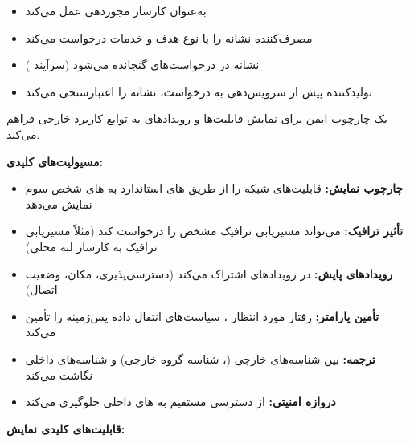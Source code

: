 \begin{itemize}
\tightlist
\item
   به‌عنوان کارساز مجوزدهی  عمل می‌کند
\item
   مصرف‌کننده نشانه را با نوع  هدف و خدمات درخواست می‌کند
\item
  نشانه در درخواست‌های  گنجانده می‌شود (سرآیند )
\item
   تولیدکننده پیش از سرویس‌دهی به درخواست، نشانه را اعتبارسنجی می‌کند
\end{itemize}


 یک چارچوب ایمن برای نمایش قابلیت‌ها و رویدادهای  به توابع کاربرد خارجی  فراهم می‌کند.

\textbf{مسیولیت‌های کلیدی:}

\begin{itemize}
\tightlist
\item
  \textbf{چارچوب نمایش:} قابلیت‌های شبکه را از طریق های استاندارد به های شخص سوم نمایش می‌دهد
\item
  \textbf{تأثیر ترافیک:}  می‌تواند مسیریابی ترافیک مشخص را درخواست کند (مثلاً مسیریابی ترافیک به کارساز لبه محلی)
\item
  \textbf{رویدادهای پایش:}  در رویدادهای  اشتراک می‌کند (دسترسی‌پذیری، مکان، وضعیت اتصال)
\item
  \textbf{تأمین پارامتر:}  رفتار مورد انتظار ، سیاست‌های انتقال داده پس‌زمینه را تأمین می‌کند
\item
  \textbf{ترجمه:} بین شناسه‌های خارجی (، شناسه گروه خارجی) و شناسه‌های داخلی  نگاشت می‌کند
\item
  \textbf{دروازه امنیتی:} از دسترسی مستقیم  به های داخلی جلوگیری می‌کند
\end{itemize}


\textbf{قابلیت‌های کلیدی نمایش:}

